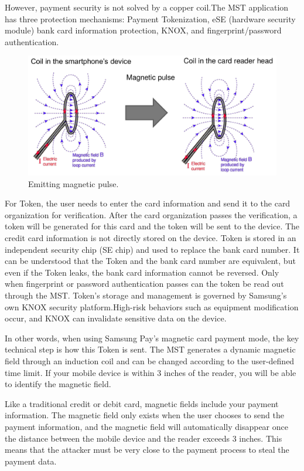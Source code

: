 \documentclass[journal]{IEEEtran}
\begin{document}
However, payment security is not solved by a copper coil.The MST application has three protection mechanisms: Payment Tokenization, eSE (hardware security module) bank card information protection, KNOX, and fingerprint/password authentication.

\begin{figure}[htbp]
\centerline{\includegraphics[scale=0.18]{Emittingmagneticpulse.png}}
\caption{Emitting magnetic pulse.}
\label{fig}
\end{figure}

For Token, the user needs to enter the card information and send it to the card organization for verification. After the card organization passes the verification, a token will be generated for this card and the token will be sent to the device. The credit card information is not directly stored on the device. Token is stored in an independent security chip (SE chip) and used to replace the bank card number. It can be understood that the Token and the bank card number are equivalent, but even if the Token leaks, the bank card information cannot be reversed. Only when fingerprint or password authentication passes can the token be read out through the MST. Token's storage and management is governed by Samsung's own KNOX security platform.High-risk behaviors such as equipment modification occur, and KNOX can invalidate sensitive data on the device.

In other words, when using Samsung Pay's magnetic card payment mode, the key technical step is how this Token is sent. The MST generates a dynamic magnetic field through an induction coil and can be changed according to the user-defined time limit. If your mobile device is within 3 inches of the reader, you will be able to identify the magnetic field.

Like a traditional credit or debit card, magnetic fields include your payment information. The magnetic field only exists when the user chooses to send the payment information, and the magnetic field will automatically disappear once the distance between the mobile device and the reader exceeds 3 inches. This means that the attacker must be very close to the payment process to steal the payment data.
\end{document}
